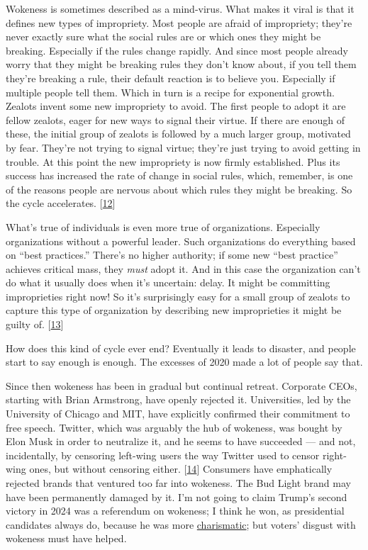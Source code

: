 Wokeness is sometimes described as a mind-virus. What makes it viral is
that it defines new types of impropriety. Most people are afraid of
impropriety; they're never exactly sure what the social rules are or
which ones they might be breaking. Especially if the rules change
rapidly. And since most people already worry that they might be breaking
rules they don't know about, if you tell them they're breaking a rule,
their default reaction is to believe you. Especially if multiple people
tell them. Which in turn is a recipe for exponential growth. Zealots
invent some new impropriety to avoid. The first people to adopt it are
fellow zealots, eager for new ways to signal their virtue. If there are
enough of these, the initial group of zealots is followed by a much
larger group, motivated by fear. They're not trying to signal virtue;
they're just trying to avoid getting in trouble. At this point the new
impropriety is now firmly established. Plus its success has increased
the rate of change in social rules, which, remember, is one of the
reasons people are nervous about which rules they might be breaking. So
the cycle accelerates. {[}\hyperref[f12n]{12}{]}

What's true of individuals is even more true of organizations.
Especially organizations without a powerful leader. Such organizations
do everything based on ``best practices.'' There's no higher authority;
if some new ``best practice'' achieves critical mass, they \emph{must}
adopt it. And in this case the organization can't do what it usually
does when it's uncertain: delay. It might be committing improprieties
right now! So it's surprisingly easy for a small group of zealots to
capture this type of organization by describing new improprieties it
might be guilty of. {[}\hyperref[f13n]{13}{]}

How does this kind of cycle ever end? Eventually it leads to disaster,
and people start to say enough is enough. The excesses of 2020 made a
lot of people say that.

Since then wokeness has been in gradual but continual retreat. Corporate
CEOs, starting with Brian Armstrong, have openly rejected it.
Universities, led by the University of Chicago and MIT, have explicitly
confirmed their commitment to free speech. Twitter, which was arguably
the hub of wokeness, was bought by Elon Musk in order to neutralize it,
and he seems to have succeeded --- and not, incidentally, by censoring
left-wing users the way Twitter used to censor right-wing ones, but
without censoring either. {[}\hyperref[f14n]{14}{]} Consumers have
emphatically rejected brands that ventured too far into wokeness. The
Bud Light brand may have been permanently damaged by it. I'm not going
to claim Trump's second victory in 2024 was a referendum on wokeness; I
think he won, as presidential candidates always do, because he was more
\href{charisma.html}{charismatic}; but voters' disgust with wokeness
must have helped.

